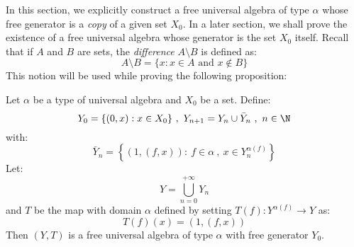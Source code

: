 In this section, we explicitly
construct a free universal algebra of type $\alpha$ whose free generator is a {\em
copy} of a given set $X_{0}$. In a later section, we shall prove the existence of
a free universal algebra whose generator is the set $X_{0}$ itself. Recall that if
$A$ and $B$ are sets, the {\em difference} $A\setminus B$ is defined as:
    \[
    A\setminus B =\{x: x\in A\mbox{\ and\ }x\not\in B\}
    \]
This notion will be used while proving the following proposition:
\begin{prop}\label{logic:prop:construction} Let $\alpha$ be a type of universal
algebra and $X_{0}$ be a set. Define:
    \[
    Y_{0}=\{(0,x):x\in X_{0}\}\ ,\ Y_{n+1}=Y_{n}\cup\bar{Y}_{n}\ ,\ n\in\N
    \]
with:
    \[
    \bar{Y}_{n}=\left\{(1,(f,x)):\ f\in\alpha\ ,\ x\in Y_{n}^{\alpha(f)}\right\}
    \]
Let:
    \[
    Y=\bigcup_{n=0}^{+\infty}Y_{n}
    \]
and $T$ be the map with domain $\alpha$ defined by setting $T(f):Y^{\alpha(f)}\to
Y$ as: \[
    T(f)(x)=(1,(f,x))
\] Then $(Y,T)$ is a free universal algebra of type $\alpha$ with free generator
$Y_{0}$.
\end{prop}
